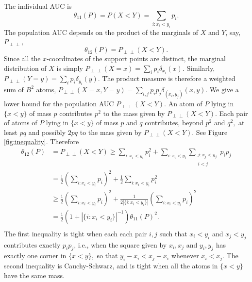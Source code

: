 \documentclass[12pt]{article}
\DeclareMathOperator{\AUC}{AUC}
\renewcommand{\P}{P}
\newcommand{\cind}{\perp \!\!\! \perp}
\newcommand{\aucindiv}{\theta_{11}}%
\newcommand{\aucpop}{\theta_{12}}%
\newcommand{\Pind}{P_{\cind}}
\begin{document}
The individual AUC is
$$\aucindiv(P)=\P(X<Y)=\underset{i:x_i<y_i}{\sum} p_i.$$
The population AUC depends on the product of the marginals  of $X$ and
$Y$, say, $\Pind$,
$$\theta_{12}(\P)=\Pind(X<Y).$$
Since all the $x$-coordinates of the support points are distinct, the
marginal distribution of $X$ is simply
$\Pind(X=x)=\sum_i p_i\delta_{x_i}(x)$. Similarly,
$\Pind(Y=y)=\sum_i p_i\delta_{y_i}(y).$ The product measure is
therefore a weighted sum of $B^2$ atoms,
$\Pind(X=x,Y=y)=\sum_{i,j}p_ip_j\delta_{(x_i,y_j)}(x,y)$. We give a
lower bound for the population AUC $\Pind(X<Y)$. An atom of $\P$ lying
in $\{x<y\}$ of mass $p$ contributes $p^2$ to the mass given by
$\Pind(X<Y)$. Each pair of atoms of $\P$ lying in $\{x<y\}$ of mass
$p$ and $q$ contributes, beyond $p^2$ and $q^2,$ at least $pq$ and possibly $2pq$ to the mass
given by $\Pind(X<Y)$. See Figure \ref{fig:inequality}. %
Therefore
\begin{align}
  \aucpop(\P)&=\Pind(X<Y) \ge \sum_{i:x_i<y_i} p_i^2 +
           \sum_{i:x_i<y_i}\underset{\substack{j:x_j<y_j\\i<j}}{\sum} p_ip_j\\
         &= \frac{1}{2}\left(\underset{i:x_i<y_i}{\sum} p_i\right)^2 +
           \frac{1}{2}\underset{i:x_i<y_i}{\sum} p_i^2\\
         &\ge \frac{1}{2}\left(\underset{i:x_i<y_i}{\sum} p_i\right)^2 +
           \frac{1}{2|\{i:x_i<y_i\}|}\left(\underset{i:x_i<y_i}{\sum} p_i\right)^2\\
         &= \frac{1}{2}(1+|\{i:x_i<y_i\}|^{-1})\aucindiv(\P)^2.\\
\end{align}
The first inequality is tight when each each pair $i,j$ such that
$x_i<y_i$ and $x_j<y_j$ contributes exactly $p_ip_j$, i.e., when the
square given by $x_i,x_j$ and $y_i,y_j$ has exactly one corner in
$\{x<y\},$ so that $y_i-x_i < x_j-x_i$ whenever $x_i<x_j$. The second inequality is Cauchy-Schwarz, and is
tight when all the atoms in $\{x<y\}$ have the same mass.
\end{document}
